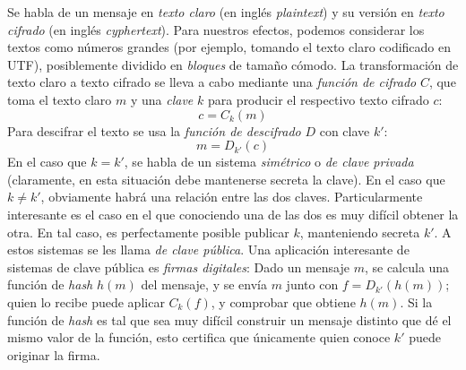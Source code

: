   Se habla de un mensaje en \emph{texto claro}%
  (en inglés \emph{\foreignlanguage{english}{plaintext}})%
  y su versión en \emph{texto cifrado}%
  (en inglés \emph{\foreignlanguage{english}{cyphertext}}).%
  Para nuestros efectos,
  podemos considerar los textos como números grandes
  (por ejemplo,
   tomando el texto claro codificado en UTF),%
  posiblemente dividido en \emph{bloques} de tamaño cómodo.
  La transformación de texto claro a texto cifrado se lleva a cabo
  mediante una \emph{función de cifrado} \(C\),%
  que toma el texto claro \(m\) y una \emph{clave} \(k\)%
  para producir el respectivo texto cifrado \(c\):
  \begin{equation*}
    c = C_k(m)
  \end{equation*}
  Para descifrar el texto
  se usa la \emph{función de descifrado} \(D\)%
  con clave \(k'\):
  \begin{equation*}
    m = D_{k'}(c)
  \end{equation*}
  En el caso que \(k = k'\),
  se habla de un sistema \emph{simétrico}%
  o \emph{de clave privada}%
  (claramente,
   en esta situación debe mantenerse secreta la clave).
  En el caso que \(k \ne k'\),
  obviamente habrá una relación entre las dos claves.
  Particularmente interesante
  es el caso en el que conociendo una de las dos
  es muy difícil obtener la otra.
  En tal caso,
  es perfectamente posible publicar \(k\),
  manteniendo secreta \(k'\).
  A estos sistemas se les llama \emph{de clave pública}.%
  Una aplicación interesante de sistemas de clave pública
  es \emph{firmas digitales}:%
  Dado un mensaje \(m\),
  se calcula una función de \emph{\emph{\foreignlanguage{english}{hash}}}%
  \(h(m)\) del mensaje,
  y se envía \(m\) junto con \(f = D_{k'}(h(m))\);
  quien lo recibe puede aplicar \(C_k(f)\),
  y comprobar que obtiene \(h(m)\).
  Si la función de \emph{\emph{\foreignlanguage{english}{hash}}}
  es tal que sea muy difícil construir un mensaje distinto
  que dé el mismo valor de la función,
  esto certifica
  que únicamente quien conoce \(k'\) puede originar la firma.

